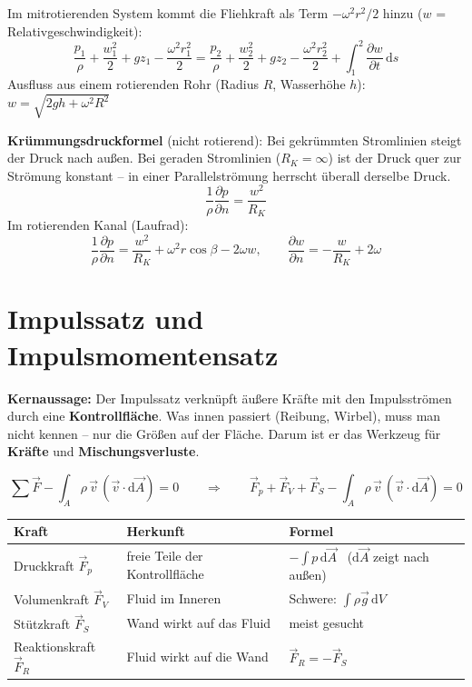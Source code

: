 \documentclass[11pt,a4paper]{article}
\newcommand{\dd}{\mathrm{d}}
\begin{document}
Im mitrotierenden System kommt die Fliehkraft als Term $-\omega^2 r^2/2$ hinzu ($w$ = Relativgeschwindigkeit):
\[
\frac{p_1}{\rho} + \frac{w_1^2}{2} + g z_1 - \frac{\omega^2 r_1^2}{2} = \frac{p_2}{\rho} + \frac{w_2^2}{2} + g z_2 - \frac{\omega^2 r_2^2}{2} + \int_1^2\frac{\partial w}{\partial t}\,\dd s
\]
Ausfluss aus einem rotierenden Rohr (Radius $R$, Wasserhöhe $h$): \ $w = \sqrt{2 g h + \omega^2 R^2}$

\textbf{Krümmungsdruckformel} (nicht rotierend): Bei gekrümmten Stromlinien steigt der Druck nach außen. Bei geraden Stromlinien ($R_K = \infty$) ist der Druck quer zur Strömung konstant -- in einer Parallelströmung herrscht überall derselbe Druck.
\[
\frac{1}{\rho}\frac{\partial p}{\partial n} = \frac{w^2}{R_K}
\]
Im rotierenden Kanal (Laufrad):
\[
\frac{1}{\rho}\frac{\partial p}{\partial n} = \frac{w^2}{R_K} + \omega^2 r\cos\beta - 2\omega w,
\qquad
\frac{\partial w}{\partial n} = -\frac{w}{R_K} + 2\omega
\]

\section{Impulssatz und Impulsmomentensatz}

\textbf{Kernaussage:} Der Impulssatz verknüpft äußere Kräfte mit den Impulsströmen durch eine \textbf{Kontrollfläche}. Was innen passiert (Reibung, Wirbel), muss man nicht kennen -- nur die Größen auf der Fläche. Darum ist er das Werkzeug für \textbf{Kräfte} und \textbf{Mischungsverluste}.

\begin{formel}[title={Impulssatz (stationär)}]
\[
\sum\vec F - \int_A \rho\,\vec v\,(\vec v\cdot\dd\vec A) = 0
\qquad\Longrightarrow\qquad
\vec F_p + \vec F_V + \vec F_S - \int_A \rho\,\vec v\,(\vec v\cdot\dd\vec A) = 0
\]
\end{formel}

\begin{center}
\small
\renewcommand{\arraystretch}{1.25}
\begin{tabular}{@{}lll@{}}
\toprule
Kraft & Herkunft & Formel \\ \midrule
Druckkraft $\vec F_p$ & freie Teile der Kontrollfläche & $-\int p\,\dd\vec A$ \ ($\dd\vec A$ zeigt nach außen) \\
Volumenkraft $\vec F_V$ & Fluid im Inneren & Schwere: $\int \rho\vec g\,\dd V$ \\
Stützkraft $\vec F_S$ & Wand wirkt auf das Fluid & meist gesucht \\
Reaktionskraft $\vec F_R$ & Fluid wirkt auf die Wand & $\vec F_R = -\vec F_S$ \\
\bottomrule
\end{tabular}
\end{center}
\end{document}
